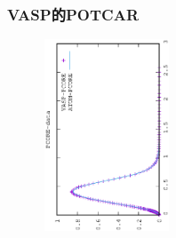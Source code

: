 {\frame
{
	\frametitle{\rm{VASP}的\rm{POTCAR}}
\begin{minipage}{0.58\textwidth}
\centering
\vspace{-0.10in}
\fontsize{3.3pt}{1.9pt}\selectfont{
}
\end{minipage}
\hfill
\begin{minipage}{0.40\textwidth}
\begin{figure}[t!]
\centering
\vspace{-0.05in}
\includegraphics[height=2.25in,width=1.5in,viewport=0 0 350 550, angle=-90, clip]{Figures/PCORE-data.eps}
\label{psedudocore_density_Function}
\end{figure}
\end{minipage}
}

}
